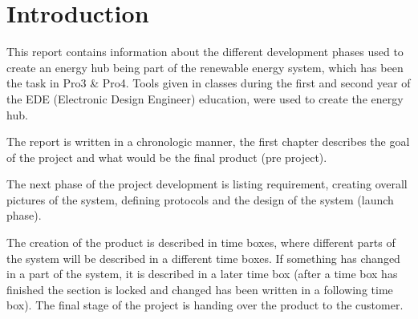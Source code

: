 
\chapter{Introduction}
This report contains information about the different development phases used to create an energy hub being part of the renewable energy system, which has been the task in Pro3 \& Pro4. Tools given in classes during the first and second year of the EDE (Electronic Design Engineer) education, were used to create the energy hub. 

The report is written in a chronologic manner, the first chapter describes the goal of the project and what would be the final product (pre project). 

The next phase of the project development is listing requirement, creating overall pictures of the system, defining protocols and the design of the system (launch phase). 

The creation of the product is described in time boxes, where different parts of the system will be described in a different time boxes. If something has changed in a part of the system, it is described in a later time box (after a time box has finished the section is locked and changed has been written in a following time box).
The final stage of the project is handing over the product to the customer.
	

\newpage

